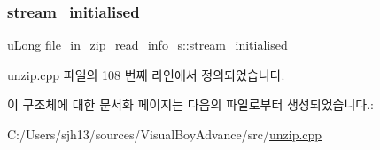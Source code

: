 \subsubsection{\texorpdfstring{stream\+\_\+initialised}{stream\_initialised}}
{\footnotesize\ttfamily u\+Long file\+\_\+in\+\_\+zip\+\_\+read\+\_\+info\+\_\+s\+::stream\+\_\+initialised}



unzip.\+cpp 파일의 108 번째 라인에서 정의되었습니다.



이 구조체에 대한 문서화 페이지는 다음의 파일로부터 생성되었습니다.\+:\begin{DoxyCompactItemize}
\item 
C\+:/\+Users/sjh13/sources/\+Visual\+Boy\+Advance/src/\mbox{\hyperlink{unzip_8cpp}{unzip.\+cpp}}\end{DoxyCompactItemize}
